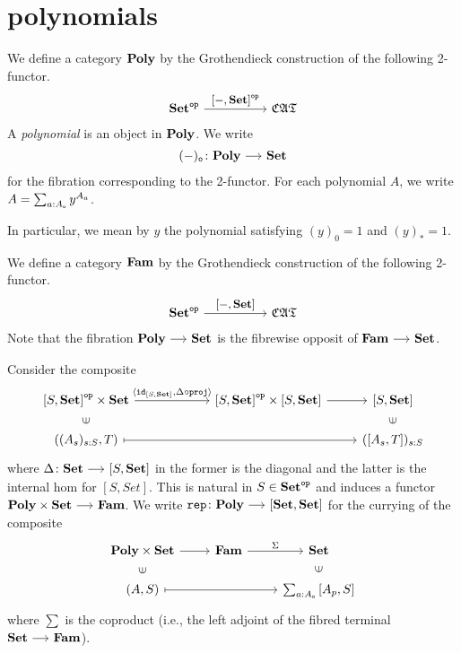 \documentclass[a4paper,dvipsnames, 11pt]{amsart}
\begin{document}
\section{polynomials}
\begin{definition}
	We define a category $\mathbf{Poly}$ by the Grothendieck construction of the following 2-functor.
	\[
		\Set^\op
		\arr"\left[-,\Set\right]^\op"[][5]
		\CATbi
	\]
	A \emph{polynomial} is an object in $\mathbf{Poly}$.
	We write
	\[
		(-)_\ob\colon\Poly\arr\Set
	\]
	for the fibration corresponding to the 2-functor.
	For each polynomial $A$,
	we write $A=\sum_{a: A_{\mathtt{o}}}y^{A_a}$.

	In particular, we mean by $y$ the polynomial satisfying
	$(y)_0=1$ and $(y)_*=1$.
\end{definition}
\begin{definition}
	We define a category $\mathbf{Fam}$ by the Grothendieck construction of the following 2-functor.
	\[
		\Set^\op
		\arr"\left[-,\Set\right]"[][5]
		\CATbi
	\]
	Note that the fibration $\Poly\arr\Set$ is the fibrewise opposit of $\Fam\arr\Set$.
\end{definition}
\begin{definition}
	Consider the composite
	\[
		\begin{tikzcd}[row sep=5mm]
			\left[S,\Set\right]^\op\times\Set
			\ar[rr,"{\langle\id_{[S,\Set]},\Delta\circ\proj\rangle}"]
				&\ &
				\left[S,\Set\right]^\op\times\left[S,\Set\right]
				\ar[r]
					&
					\left[S,\Set\right]
			\\
			((A_s)_{s\tcolon S}, T)
			\ar[rrr,mapsto]
			\ar[u,"\in"marking,phantom]
				&\ &
					&
					(\left[A_s,T\right])_{s\tcolon S}
					\ar[u,"\in"marking,phantom]
		\end{tikzcd}
	\]
	where $\Delta\colon\Set\arr\left[S,\Set\right]$ in the former is the diagonal and
	the latter is the internal hom for $[S,Set]$.
	This is natural in $S\in\mathbf{Set}^{\mathtt{op}}$ and induces a functor
	$\Poly\times\Set\arr\Fam$.
	We write $\rep\colon\Poly\arr\left[\Set,\Set\right]$ for the currying of the composite
	\[
		\begin{tikzcd}[row sep=5mm]
			\Poly\times\Set
			\ar[r]
				&
				\Fam
				\ar[r,"\Sigma"]
					&
					\Set
			\\
			(A,S)
			\ar[rr,mapsto]
			\ar[u,"\in"marking,phantom]
				&
					&
					\sum_{a\tcolon A_\ob}\left[A_p,S\right]
					\ar[u,"\in"marking,phantom]
		\end{tikzcd}
	\]
	where $\sum$ is the coproduct (i.e., the left adjoint of the fibred terminal $\Set\arr\Fam$).
\end{definition}
\end{document}
